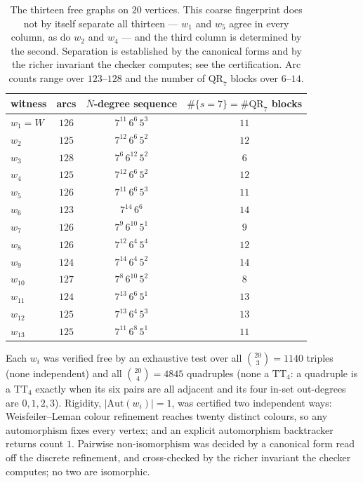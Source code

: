 \documentclass[11pt]{amsart}
\newcommand{\TT}[1]{\mathrm{TT}_{#1}}
\newcommand{\QR}{\mathrm{QR}_7}
\newcommand{\Aut}{\mathrm{Aut}}
\theoremstyle{plain}
\theoremstyle{definition}
\theoremstyle{remark}
\begin{document}
\begin{table}[h]
\centering
\begin{tabular}{lccc}
\toprule
witness & arcs & $\overline{N}$-degree sequence & $\#\{s{=}7\}=\#\QR$ blocks\\
\midrule
$w_{1}=W$ & $126$ & $7^{11}\,6^{6}\,5^{3}$ & $11$\\
$w_{2}$   & $125$ & $7^{12}\,6^{6}\,5^{2}$ & $12$\\
$w_{3}$   & $128$ & $7^{6}\,6^{12}\,5^{2}$ & $6$\\
$w_{4}$   & $125$ & $7^{12}\,6^{6}\,5^{2}$ & $12$\\
$w_{5}$   & $126$ & $7^{11}\,6^{6}\,5^{3}$ & $11$\\
$w_{6}$   & $123$ & $7^{14}\,6^{6}$        & $14$\\
$w_{7}$   & $126$ & $7^{9}\,6^{10}\,5^{1}$ & $9$\\
$w_{8}$   & $126$ & $7^{12}\,6^{4}\,5^{4}$ & $12$\\
$w_{9}$   & $124$ & $7^{14}\,6^{4}\,5^{2}$ & $14$\\
$w_{10}$  & $127$ & $7^{8}\,6^{10}\,5^{2}$ & $8$\\
$w_{11}$  & $124$ & $7^{13}\,6^{6}\,5^{1}$ & $13$\\
$w_{12}$  & $125$ & $7^{13}\,6^{4}\,5^{3}$ & $13$\\
$w_{13}$  & $125$ & $7^{11}\,6^{8}\,5^{1}$ & $11$\\
\bottomrule
\end{tabular}
\caption{The thirteen free graphs on $20$ vertices. This coarse
fingerprint does not by itself separate all thirteen --- $w_1$ and $w_5$
agree in every column, as do $w_2$ and $w_4$ --- and the third column is
determined by the second. Separation is established by the canonical forms
and by the richer invariant the checker computes; see the certification. Arc counts range over
$123$--$128$ and the number of $\QR$ blocks over $6$--$14$.}
\label{tab:inv}
\end{table}

Each $w_i$ was verified free by an exhaustive test over all
$\binom{20}{3}=1140$ triples (none independent) and all
$\binom{20}{4}=4845$ quadruples (none a $\TT{4}$: a quadruple is a
$\TT{4}$ exactly when its six pairs are all adjacent and its four in-set
out-degrees are $0,1,2,3$). Rigidity, $|\Aut(w_i)|=1$, was certified two
independent ways: Weisfeiler--Leman colour refinement reaches twenty
distinct colours, so any automorphism fixes every vertex; and an explicit
automorphism backtracker returns count $1$. Pairwise non-isomorphism was
decided by a canonical form read off the discrete refinement, and
cross-checked by the richer invariant the checker computes; no two are
isomorphic.
\end{document}
